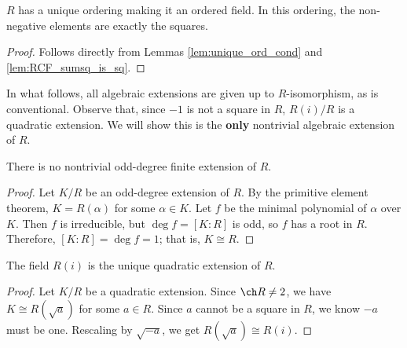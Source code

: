 \begin{lemma}
  \label{lem:RCF_ord_unique}
  \mathlibok
  $R$ has a unique ordering making it an ordered field. In this ordering, the non-negative elements are exactly the squares.
\end{lemma}
\begin{proof}
  \mathlibok
  Follows directly from Lemmas \ref{lem:unique_ord_cond} and \ref{lem:RCF_sumsq_is_sq}.
\end{proof}

In what follows, all algebraic extensions are given up to $R$-isomorphism, as is conventional. Observe that, since $-1$ is not a square in $R$, $R(i)/R$ is a quadratic extension. We will show this is the \textbf{only} nontrivial algebraic extension of $R$.

\begin{lemma}
  \label{lem:alg_ext_odd_deg}
  \leanok
  There is no nontrivial odd-degree finite extension of $R$.
\end{lemma}
\begin{proof}
  \leanok
  Let $K/R$ be an odd-degree extension of $R$. By the primitive element theorem, $K=R(\alpha)$ for some $\alpha\in K$. Let $f$ be the minimal polynomial of $\alpha$ over $K$. Then $f$ is irreducible, but $\deg f=[K:R]$ is odd, so $f$ has a root in $R$. Therefore, $[K:R]=\deg f=1$; that is, $K\cong R$.
\end{proof}

\begin{lemma}
  \label{lem:ext_deg_2}
  \leanok
  The field $R(i)$ is the unique quadratic extension of $R$.
\end{lemma}
\begin{proof}
  \leanok
  Let $K/R$ be a quadratic extension. Since $\ch R\neq2$, we have $K\cong R(\sqrt{a})$ for some $a\in R$. Since $a$ cannot be a square in $R$, we know $-a$ must be one. Rescaling by $\sqrt{-a}$, we get $R(\sqrt{a})\cong R(i)$.
\end{proof}

